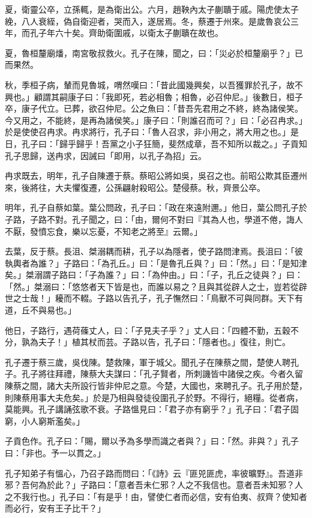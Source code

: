 \begin{pinyinscope}
夏，衛靈公卒，立孫輒，是為衛出公。六月，趙鞅內太子蒯聵于戚。陽虎使太子絻，八人衰絰，偽自衛迎者，哭而入，遂居焉。冬，蔡遷于州來。是歲魯哀公三年，而孔子年六十矣。齊助衛圍戚，以衛太子蒯聵在故也。

夏，魯桓釐廟燔，南宮敬叔救火。孔子在陳，聞之，曰：「災必於桓釐廟乎？」已而果然。

秋，季桓子病，輦而見魯城，喟然嘆曰：「昔此國幾興矣，以吾獲罪於孔子，故不興也。」顧謂其嗣康子曰：「我即死，若必相魯；相魯，必召仲尼。」後數日，桓子卒，康子代立。已葬，欲召仲尼。公之魚曰：「昔吾先君用之不終，終為諸侯笑。今又用之，不能終，是再為諸侯笑。」康子曰：「則誰召而可？」曰：「必召冉求。」於是使使召冉求。冉求將行，孔子曰：「魯人召求，非小用之，將大用之也。」是日，孔子曰：「歸乎歸乎！吾黨之小子狂簡，斐然成章，吾不知所以裁之。」子貢知孔子思歸，送冉求，因誡曰「即用，以孔子為招」云。

冉求既去，明年，孔子自陳遷于蔡。蔡昭公將如吳，吳召之也。前昭公欺其臣遷州來，後將往，大夫懼復遷，公孫翩射殺昭公。楚侵蔡。秋，齊景公卒。

明年，孔子自蔡如葉。葉公問政，孔子曰：「政在來遠附邇。」他日，葉公問孔子於子路，子路不對。孔子聞之，曰：「由，爾何不對曰『其為人也，學道不倦，誨人不厭，發憤忘食，樂以忘憂，不知老之將至』云爾。」

去葉，反于蔡。長沮、桀溺耦而耕，孔子以為隱者，使子路問津焉。長沮曰：「彼執輿者為誰？」子路曰：「為孔丘。」曰：「是魯孔丘與？」曰：「然。」曰：「是知津矣。」桀溺謂子路曰：「子為誰？」曰：「為仲由。」曰：「子，孔丘之徒與？」曰：「然。」桀溺曰：「悠悠者天下皆是也，而誰以易之？且與其從辟人之士，豈若從辟世之士哉！」耰而不輟。子路以告孔子，孔子憮然曰：「鳥獸不可與同群。天下有道，丘不與易也。」

他日，子路行，遇荷蓧丈人，曰：「子見夫子乎？」丈人曰：「四體不勤，五穀不分，孰為夫子！」植其杖而芸。子路以告，孔子曰：「隱者也。」復往，則亡。

孔子遷于蔡三歲，吳伐陳。楚救陳，軍于城父。聞孔子在陳蔡之間，楚使人聘孔子。孔子將往拜禮，陳蔡大夫謀曰：「孔子賢者，所刺譏皆中諸侯之疾。今者久留陳蔡之間，諸大夫所設行皆非仲尼之意。今楚，大國也，來聘孔子。孔子用於楚，則陳蔡用事大夫危矣。」於是乃相與發徒役圍孔子於野。不得行，絕糧。從者病，莫能興。孔子講誦弦歌不衰。子路慍見曰：「君子亦有窮乎？」孔子曰：「君子固窮，小人窮斯濫矣。」

子貢色作。孔子曰：「賜，爾以予為多學而識之者與？」曰：「然。非與？」孔子曰：「非也。予一以貫之。」

孔子知弟子有慍心，乃召子路而問曰：「《詩》云『匪兕匪虎，率彼曠野』。吾道非邪？吾何為於此？」子路曰：「意者吾未仁邪？人之不我信也。意者吾未知邪？人之不我行也。」孔子曰：「有是乎！由，譬使仁者而必信，安有伯夷、叔齊？使知者而必行，安有王子比干？」


\end{pinyinscope}

